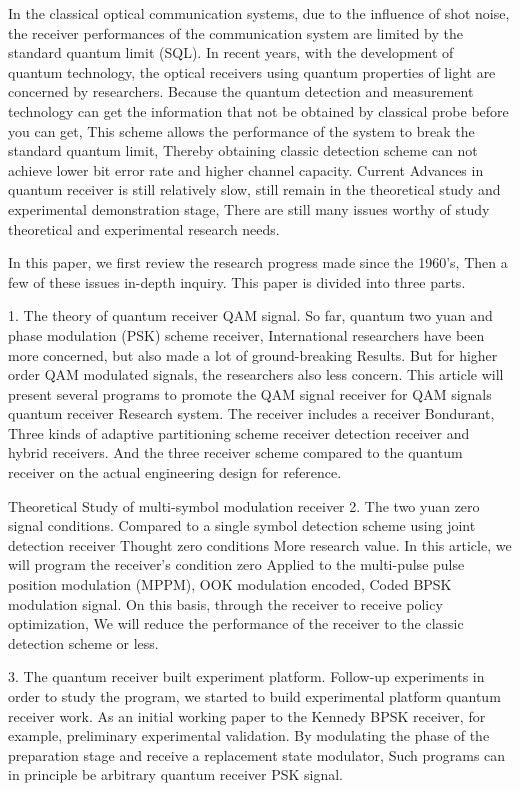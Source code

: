 \begin{enabstract}
In the classical optical communication systems, 
due to the influence of shot noise,
the receiver performances of the communication system  
are limited by the standard quantum limit (SQL).
In recent years, with the development of quantum technology, 
the optical receivers using quantum properties of light 
are concerned by researchers.
Because the quantum detection and measurement  technology can get the information 
that not be obtained by classical probe before you can get,
This scheme allows the performance of the system to break the standard quantum limit,
Thereby obtaining classic detection scheme can not achieve lower bit error rate and higher channel capacity.
Current Advances in quantum receiver is still relatively slow, still remain in the theoretical study and experimental demonstration stage,
There are still many issues worthy of study theoretical and experimental research needs.


In this paper, we first review the research progress made since the 1960's,
Then a few of these issues in-depth inquiry. This paper is divided into three parts.


1. The theory of quantum receiver QAM signal.
So far, quantum two yuan and phase modulation (PSK) scheme receiver,
International researchers have been more concerned, but also made a lot of ground-breaking
Results. But for higher order QAM modulated signals, the researchers also less concern.
This article will present several programs to promote the QAM signal receiver for QAM signals quantum receiver
Research system. The receiver includes a receiver Bondurant,
Three kinds of adaptive partitioning scheme receiver detection receiver and hybrid receivers.
And the three receiver scheme compared to the quantum receiver on the actual engineering design
for reference.

Theoretical Study of multi-symbol modulation receiver 2. The two yuan zero signal conditions.
Compared to a single symbol detection scheme using joint detection receiver Thought zero conditions
More research value. In this article, we will program the receiver's condition zero
Applied to the multi-pulse pulse position modulation (MPPM), OOK modulation encoded,
Coded BPSK modulation signal. On this basis, through the receiver to receive policy optimization,
We will reduce the performance of the receiver to the classic detection scheme or less.

3. The quantum receiver built experiment platform.
Follow-up experiments in order to study the program, we started to build experimental platform quantum receiver work.
As an initial working paper to the Kennedy BPSK receiver, for example, preliminary experimental validation.
By modulating the phase of the preparation stage and receive a replacement state modulator,
Such programs can in principle be arbitrary quantum receiver PSK signal.

\end{enabstract}
